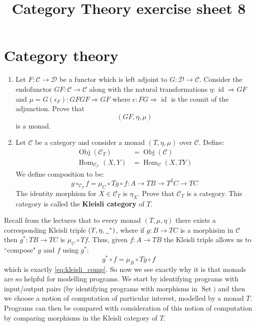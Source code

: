 \documentclass[12pt]{article}
\title{Category Theory exercise sheet 8}
\theoremstyle{plain}
\theoremstyle{definition}
\newcommand{\scr}[1]{\mathscr{#1}}
\newcommand{\und}[1]{\underline{\hspace{#1 cm}}}
\newcommand{\lto}{\longrightarrow}
\begin{document}
	
	\maketitle
	
	\section{Category theory}
	\begin{enumerate}
		\item Let $F: \scr{C} \lto \scr{D}$ be a functor which is left adjoint to $G: \scr{D} \lto \scr{C}$. Consider the endofunctor $GF: \scr{C} \lto \scr{C}$ along with the natural transformations $\eta: \operatorname{id} \Rightarrow GF$ and $\mu = G(\epsilon_F): GFGF \Rightarrow GF$ where $\epsilon: FG \Rightarrow \operatorname{id}$ is the counit of the adjunction. Prove that
		\begin{equation}
			(GF, \eta, \mu)
		\end{equation}
		is a monad.
		\item Let $\scr{C}$ be a category and consider a monad $(T, \eta, \mu)$ over $\scr{C}$. Define:
		\begin{align*}
			\operatorname{Obj}(\scr{C}_T) &= \operatorname{Obj}(\scr{C})\\
			\operatorname{Hom}_{\scr{C_T}}(X,Y) &= \operatorname{Hom}_{\scr{C}}(X, TY)
			\end{align*}
			We define composition to be:
			\begin{equation}\label{eq:kleisli_comp}
				g \circ_{\scr{C}_T} f = \mu_C \circ Tg \circ f: A \lto TB \lto T^2C \lto TC
			\end{equation}
			The identity morphism for $X \in \scr{C}_T$ is $\eta_X$.
			Prove that $\scr{C}_T$ is a category. This category is called the \textbf{Kleisli category} of $T$.
		\end{enumerate}		
		Recall from the lectures that to every monad $(T, \mu, \eta)$ there exists a corresponding Kleisli triple $(T, \eta, \und{0.2}^\ast)$, where if $g: B \lto TC$ is a morphisim in $\scr{C}$ then $g^\ast: TB \lto TC$ is $\mu_C \circ Tf$. Thus, given $f: A\lto TB$ the Kleisli triple allows us to ``compose" $g$ and $f$ using $g^\ast$:
		\begin{equation}
			g^\ast \circ f = \mu_B \circ Tg \circ f
			\end{equation}
		which is exactly \eqref{eq:kleisli_comp}. So now we see exactly why it is that monads are so helpful for modelling programs. We start by identifying programs with input/output pairs (by identifying programs with morphisms in $\underline{\operatorname{Set}})$ and then we choose a notion of computation of particular interest, modelled by a monad $T$. Programs can then be compared with consideration of this notion of computation by comparing morphisms in the Kleisli category of $T$.
\end{document}
